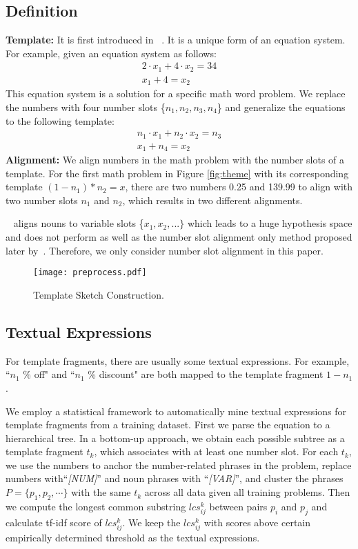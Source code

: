 \documentclass[11pt,letterpaper]{article}
\begin{document}
\subsection{Definition}
\textbf{Template:} It is first introduced in ~. It is a unique form of an equation system. For example, given an equation system as follows:
\[
\begin{array}{c}
2\cdot{}x_1 + 4\cdot{}x_2 = 34\\
x_1 + 4 = x_2
\end{array}
\]
This equation system is a solution for a specific math word problem. We replace the numbers with four number slots \{$n_1, n_2, n_3, n_4$\} and generalize the equations to the following template:
\[
\begin{array}{c}
n_1\cdot{}x_1 + n_2\cdot{}x_2 = n_3\\
x_1 + n_4 = x_2
\end{array}
\]
\textbf{Alignment:} We align numbers in the math problem with the number slots of a template. For the first math problem in Figure \ref{fig:theme} with its corresponding template $(1-n_1)*n_2=x$, there are two numbers 0.25 and 139.99 to align with two number slots $n_1$ and $n_2$, which results in two different alignments.

~ aligns nouns to variable slots \{$x_1, x_2, ...\}$ which leads to a huge hypothesis space and does not perform as well as the number slot alignment only method proposed later by~\cite{lipu2015baidu}. Therefore, we only consider number slot alignment in this paper.

\begin{figure*}[htb]
    \centering
    \texttt{[image: preprocess.pdf]}
  \caption{Template Sketch Construction.}\label{fig:preprocess}
\end{figure*}

\subsection{Textual Expressions}
\label{subsec:textPtr}
For template fragments, there are usually some textual expressions. For example, ``$n_1$ \% off" and ``$n_1$ \% discount" are both mapped to the template fragment $1-n_1$.

We employ a statistical framework to automatically mine textual expressions for template fragments from a training dataset. First we parse the equation to a hierarchical tree. In a bottom-up approach, we obtain each possible subtree as a template fragment $t_{k}$, which associates with at least one number slot. For each $t_{k}$, we use the numbers to anchor the number-related phrases in the problem, replace numbers with``\emph{[NUM]}'' and noun phrases with ``\emph{[VAR]}'', and cluster the phrases $P = \{p_{1}, p_{2}, \cdots\}$ with the same $t_{k}$ across all data given all training problems. Then we compute the longest common substring $lcs_{ij}^k$ between pairs $p_{i}$ and $p_{j}$ and calculate tf-idf score of $lcs_{ij}^k$. We keep the $lcs_{ij}^k$ with scores above certain empirically determined threshold as the textual expressions.
\end{document}
